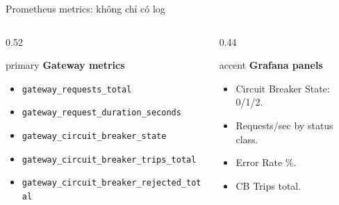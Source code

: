 \documentclass[aspectratio=169]{beamer}
\begin{document}
\begin{frame}{Prometheus metrics: không chỉ có log}
    \begin{columns}[T,onlytextwidth]
        \begin{column}{0.52\textwidth}
            \begin{claimbox}{primary}
                \textbf{Gateway metrics}
                \begin{itemize}\tiny
                    \item \texttt{gateway\_requests\_total}
                    \item \texttt{gateway\_request\_duration\_seconds}
                    \item \texttt{gateway\_circuit\_breaker\_state}
                    \item \texttt{gateway\_circuit\_breaker\_trips\_total}
                    \item \texttt{gateway\_circuit\_breaker\_rejected\_total}
                \end{itemize}
            \end{claimbox}
        \end{column}
        \begin{column}{0.44\textwidth}
            \begin{claimbox}{accent}
                \textbf{Grafana panels}
                \begin{itemize}\small
                    \item Circuit Breaker State: 0/1/2.
                    \item Requests/sec by status class.
                    \item Error Rate \%.
                    \item CB Trips total.
                \end{itemize}
            \end{claimbox}
        \end{column}
    \end{columns}
\end{frame}
\end{document}

